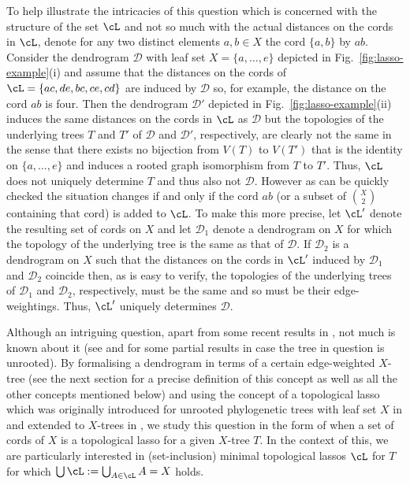 To help illustrate the intricacies of this question which is concerned with
the structure of the set $\cL$ and not so much with the actual distances on
the cords in $\cL$, denote for any two distinct elements $a,b\in X$ the cord
$\{a,b\}$ by $ab$. Consider the dendrogram $\mathcal D$ with leaf set
$X=\{a,\ldots, e\}$ depicted in Fig.~\ref{fig:lasso-example}(i) and assume
that the distances on the cords of $\cL=\{ac,de,bc,ce,cd\}$ are induced by
$\mathcal D$ so, for example, the distance on the cord $ab$ is four. Then the
dendrogram $\mathcal D'$ depicted in Fig.~\ref{fig:lasso-example}(ii) induces
the same distances on the cords in $\cL$ as $\mathcal D$ but the topologies of
the underlying trees $T$ and $T'$ of $\mathcal D$ and $\mathcal D'$,
respectively, are clearly not the same in the sense that there exists no
bijection from $V(T)$ to $V(T')$ that is the identity on $\{a,\ldots, e\}$ and
induces a rooted graph isomorphism from $T$ to $T'$.  Thus, $\cL$ does not
uniquely determine $T$ and thus also not $\mathcal D$. However as can be
quickly checked the situation changes if and only if the cord $ab$ (or a
subset of ${X\choose 2}$ containing that cord) is added to $\cL$.  To make
this more precise, let $\cL'$ denote the resulting set of cords on $X$ and let
$\mathcal D_1$ denote a dendrogram on $X$ for which the topology of the
underlying tree is the same as that of $\mathcal D$. If $\mathcal D_2$ is a
dendrogram on $X$ such that the distances on the cords in $\cL'$ induced by
$\mathcal D_1$ and $\mathcal D_2$ coincide then, as is easy to verify, the
topologies of the underlying trees of $\mathcal D_1$ and $\mathcal D_2$,
respectively, must be the same and so must be their edge-weightings. Thus,
$\cL'$ uniquely determines $\mathcal D$.

Although an intriguing question, apart from some recent results in
\cite{huber13lassoing}, not much is known about it (see \cite{dress11lassoing}
and \cite{HS13} for some partial results in case the tree in question is
unrooted).  By formalising a dendrogram in terms of a certain edge-weighted
$X$-tree (see the next section for a precise definition of this concept as
well as all the other concepts mentioned below) and using the concept of a
topological lasso which was originally introduced for unrooted phylogenetic
trees with leaf set $X$ in \cite{dress11lassoing} and extended to $X$-trees in
\cite {huber13lassoing}, we study this question in the form of when a set of
cords of $X$ is a topological lasso for a given $X$-tree $T$. In the context
of this, we are particularly interested in (set-inclusion) minimal topological
lassos $\cL$ for $T$ for which $ \bigcup \cL:=\bigcup_{A\in\cL} A=X$ holds.

